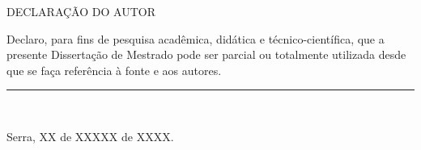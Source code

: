 {
\begin{center}
    \MakeUppercase{Declaração do Autor}
\end{center}

}

\vspace{1cm}

Declaro, para fins de pesquisa acadêmica, didática e técnico-científica, que a presente Dissertação de Mestrado pode ser parcial ou totalmente utilizada desde que se faça referência à fonte e aos autores.

\vfill

\begin{center}
    \rule{12cm}{1pt} \\
    \imprimirautor    
    
    \vfill
    
    Serra, XX de XXXXX de XXXX.
\end{center}





